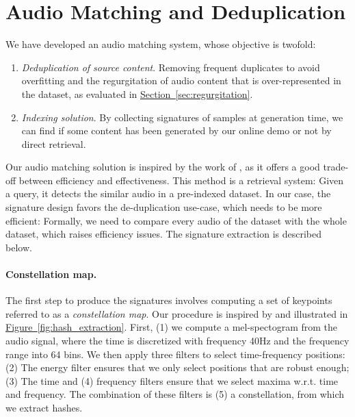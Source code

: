 \section{Audio Matching and Deduplication}
\label{sec:audiomatching}

We have developed an audio matching system, whose objective is twofold:
\begin{enumerate}
\item \textit{Deduplication of source content}. Removing frequent duplicates to avoid overfitting and the regurgitation of audio content that is over-represented in the dataset, as evaluated in \hyperref[sec:regurgitation]{Section~\ref{sec:regurgitation}}.  \\[-1.7em]
\item \textit{Indexing solution}. By collecting signatures of samples at generation time, we can find if some content has been generated by our online demo or not by direct retrieval. 
\end{enumerate}

Our audio matching solution is inspired by the work of \cite{wang2003industrial}, as it offers a good trade-off between efficiency and effectiveness. This method is a retrieval system: Given a query, it detects the similar audio in a pre-indexed dataset. In our case, the signature design favors the de-duplication use-case, which needs to be more efficient: Formally, we need to compare every audio of the dataset with the whole dataset, which raises efficiency issues.  The signature extraction is described below. 


\paragraph{Constellation map.}
The first step to produce the signatures involves computing a set of keypoints referred to as a \emph{constellation map}. Our procedure is inspired by \cite{wang2003industrial} and  illustrated in \hyperref[fig:hash_extraction]{Figure~\ref{fig:hash_extraction}}. First, (1) we compute a mel-spectogram from the audio signal, where the time is discretized with frequency 40Hz and the frequency range into 64 bins. We then apply three filters to select time-frequency positions: (2) The energy filter ensures that we only select positions that are robust enough; (3) The time and (4) frequency filters ensure that we select maxima w.r.t. time and frequency. The combination of these filters is (5) a constellation, from which we extract hashes. 
\medskip

